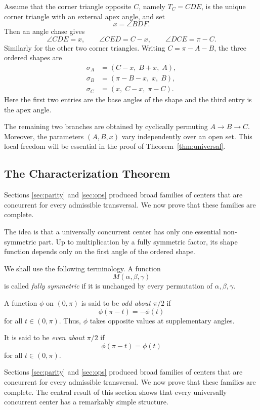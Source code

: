 \documentclass[12pt,a4paper]{amsart}
\theoremstyle{remark}
\begin{document}
Assume that the corner triangle opposite $C$, namely $T_C=CDE$, is the unique
corner triangle with an external apex angle, and set
\[
x=\angle BDF.
\]
Then an angle chase gives
\[
\angle CDE=x,\qquad
\angle CED=C-x,\qquad
\angle DCE=\pi-C.
\]
Similarly for the other two corner triangles.  Writing $C=\pi-A-B$, the three
ordered shapes are
\begin{equation}
\label{eq:shapes}
\begin{aligned}
\sigma_A&=(C-x,\;B+x,\;A),\\
\sigma_B&=(\pi-B-x,\;x,\;B),\\
\sigma_C&=(x,\;C-x,\;\pi-C).
\end{aligned}
\end{equation}
Here the first two entries are the base angles of the shape and the third entry
is the apex angle.

The remaining two branches are obtained by cyclically permuting
$A\rightarrow B\rightarrow C$.  Moreover, the parameters $(A,B,x)$ vary
independently over an open set.  This local freedom will be essential in the
proof of Theorem~\ref{thm:universal}.

\subsection{The Characterization Theorem}
\label{sec:characterization}

Sections \ref{sec:parity} and \ref{sec:ops} produced broad families of centers that are concurrent for
every admissible transversal.  We now prove that these families are complete.

The idea is that a universally concurrent center has only one essential
non-symmetric part.  Up to multiplication by a fully symmetric factor, its shape
function depends only on the first angle of the ordered shape.

We shall use the following terminology.  A function
\[
M(\alpha,\beta,\gamma)
\]
is called \emph{fully symmetric} if it is unchanged by every permutation of
\(\alpha,\beta,\gamma\).

A function \(\phi\) on \((0,\pi)\) is said to be \emph{odd about \(\pi/2\)} if
\[
\phi(\pi-t)=-\phi(t)
\]
for all \(t\in(0,\pi)\).  Thus, \(\phi\) takes opposite values at supplementary
angles.

It is said to be \emph{even about \(\pi/2\)} if
\[
\phi(\pi-t)=\phi(t)
\]
for all \(t\in(0,\pi)\).

Sections \ref{sec:parity} and \ref{sec:ops}  produced broad families of centers that are concurrent for every admissible transversal. We now prove that these families are complete. The central result of this section shows that every universally concurrent center has a remarkably simple structure.
\end{document}
